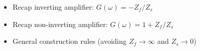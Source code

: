 \begin{itemize}
\item Recap inverting amplifier: $G(\omega) = -Z_f/Z_s$
\item Recap non-inverting amplifier: $G(\omega) = 1+Z_f/Z_s$
\item General construction rules (avoiding $Z_f \rightarrow \infty$ and $Z_s \rightarrow 0$)
\end{itemize}

